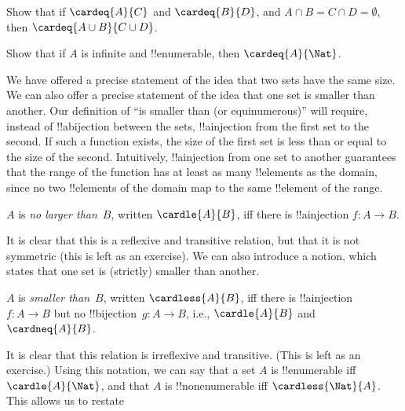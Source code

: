\begin{prob}
Show that if $\cardeq{A}{C}$ and $\cardeq{B}{D}$, and $A \cap B =
C \cap D = \emptyset$, then $\cardeq{A \cup B}{C \cup D}$.
\end{prob}

\begin{prob}
Show that if $A$ is infinite and !!{enumerable}, then
$\cardeq{A}{\Nat}$.
\end{prob}







\begin{explain}
We have offered a precise statement of the idea that two sets have the
same size. We can also offer a precise statement of the idea that one
set is smaller than another. Our definition of ``is smaller than (or
equinumerous)'' will require, instead of !!a{bijection} between the
sets, !!a{injection} from the first set to the second. If such a
function exists, the size of the first set is less than or equal to
the size of the second. Intuitively, !!a{injection} from one set to
another guarantees that the range of the function has at least as many
!!{element}s as the domain, since no two !!{element}s of the domain
map to the same !!{element} of the range.
\end{explain}

\begin{defn}
$A$ is \emph{no larger than}~$B$, written $\cardle{A}{B}$, iff there
is !!a{injection} $f \colon A \to B$.
\end{defn}

It is clear that this is a reflexive and transitive relation, but that
it is not symmetric (this is left as an exercise). We can also
introduce a notion, which states that one set is (strictly) smaller
than another. 

\begin{defn}
$A$ is \emph{smaller than}~$B$, written $\cardless{A}{B}$, iff there
is !!a{injection}~$f\colon A \to B$ but no !!{bijection}~$g\colon A
\to B$, i.e., $\cardle{A}{B}$ and $\cardneq{A}{B}$.
\end{defn}

It is clear that this relation is irreflexive
and transitive. (This is left as an exercise.) Using this notation, we
can say that a set $A$ is !!{enumerable} iff $\cardle{A}{\Nat}$, and
that $A$ is !!{nonenumerable} iff $\cardless{\Nat}{A}$. This allows us
to restate

